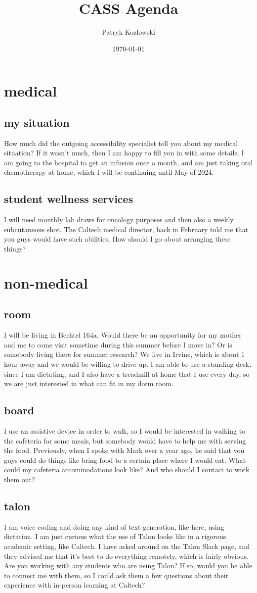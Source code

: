 \documentclass[12pt]{article}
\title{CASS Agenda}
\author{Patryk Kozlowski}
\date{\today}
\begin{document}
\maketitle
\section{medical}
\subsection{my situation}
How much did the outgoing accessibility specialist tell you about my medical situation? If it wasn't much, then I am happy to fill you in with some details. I am going to the hospital to get an infusion once a month, and am just taking oral chemotherapy at home, which I will be continuing until May of 2024.
\subsection{student wellness services}
I will need monthly lab draws for oncology purposes and then also a weekly subcutaneous shot. The Caltech medical director, back in February told me that you guys would have such abilities. How should I go about arranging these things?
\section{non-medical}
\subsection{room}
I will be living in Bechtel 164a. Would there be an opportunity for my mother and me to come visit sometime during this summer before I move in? Or is somebody living there for summer research? We live in Irvine, which is about 1 hour away and we would be willing to drive up. I am able to use a standing desk, since I am dictating, and I also have a treadmill at home that I use every day, so we are just interested in what can fit in my dorm room.
\subsection{board}
I use an assistive device in order to walk, so I would be interested in walking to the cafeteria for some meals, but somebody would have to help me with serving the food. Previously, when I spoke with Mark over a year ago, he said that you guys could do things like bring food to a certain place where I would eat. What could my cafeteria accommodations look like? And who should I contact to work them out?
\subsection{talon}
I am voice coding and doing any kind of text generation, like here, using dictation. I am just curious what the use of Talon looks like in a rigorous academic setting, like Caltech. I have asked around on the Talon Slack page, and they advised me that it's best to do everything remotely, which is fairly obvious. Are you working with any students who are using Talon? If so, would you be able to connect me with them, so I could ask them a few questions about their experience with in-person learning at Caltech?
\end{document}
